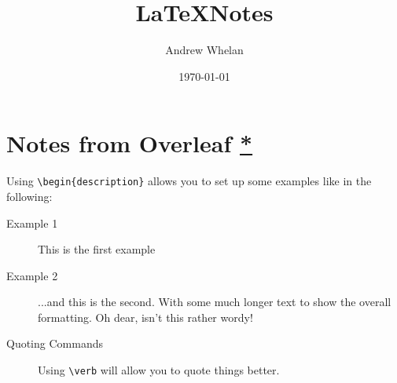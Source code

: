 \documentclass{article} %
\title{\LaTeX Notes}
\author{Andrew Whelan}
\date{\today}
\numberwithin{equation}{section}            %
\begin{document}
    \maketitle
    \thispagestyle{empty}   %
    \setcounter{page}{0}    %
    \tableofcontents        %
    \newpage                
    \section{Notes from Overleaf \href{https://www.overleaf.com/learn}{*}}

        Using \verb|\begin{description}| allows you to set up some examples like in the following:
        \begin{description}
            \item[Example 1] This is the first example
            \item[Example 2] ...and this is the second. With some much longer text to show the overall formatting. Oh dear, isn't this rather wordy!
        \end{description}
        \begin{description}
            \item[Quoting Commands] Using \verb|\verb| will allow you to quote things better.
        \end{description}
\end{document}
